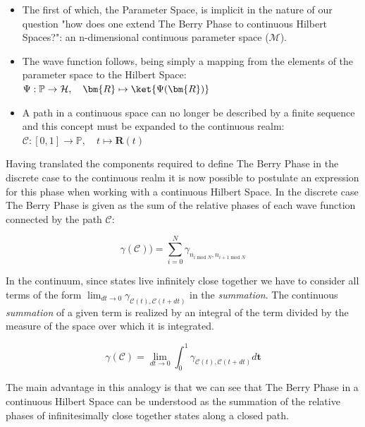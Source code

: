 \documentclass{article}
\begin{document}
\begin{itemize}

  \item The first of which, the Parameter Space, is implicit in the nature of our question "how does one extend The Berry Phase to continuous Hilbert Spaces?": an n-dimensional continuous parameter space ($\mathcal{M}$).
  \item The wave function follows, being simply a mapping from the elements of the parameter space to the Hilbert Space: $\Psi: \mathbb{P} \rightarrow \mathcal{H}, \quad \bm{R} \mapsto \ket{\Psi(\bm{R})}$

  \item A path in a continuous space can no longer be described by a finite sequence and this concept must be expanded to the continuous realm:
  $\mathcal{C}: [0, 1] \rightarrow \mathbb{P}, \quad t \mapsto \bm{R}(t)$
\end{itemize}

Having translated the components required to define The Berry Phase in the discrete case to the continuous realm it is now possible to postulate an expression for this phase when working with a continuous Hilbert Space. In the discrete case The Berry Phase is given as the sum of the relative phases of each wave function connected by the path $\mathcal{C}$:

\begin{equation*}
\gamma(\mathcal{C})) = \sum_{i = 0}^{N} \gamma_{n_{i \; \mathrm{mod} \; N}, n_{i+1 \; \mathrm{mod} \; N}} 
\end{equation*}

In the continuum, since states live infinitely close together we have to consider all terms of the form $\lim_{dt \to 0}\gamma_{\mathcal{C}(t), \mathcal{C}(t + dt)}$ in the \textit{summation}. The continuous \textit{summation} of a given term is realized by an integral of the term divided by the measure of the space over which it is integrated.

\begin{equation}\label{eq:berry_phase_analog}
  \gamma(\mathcal{C}) = \lim_{dt \to 0} \int_0^1 \gamma_{\mathcal{C}(t), \mathcal{C}(t + dt)} d \bm{t}
\end{equation}

The main advantage in this analogy is that we can see that The Berry Phase in a continuous Hilbert Space can be understood as the summation of the relative phases of infinitesimally close together states along a closed path.
\end{document}
